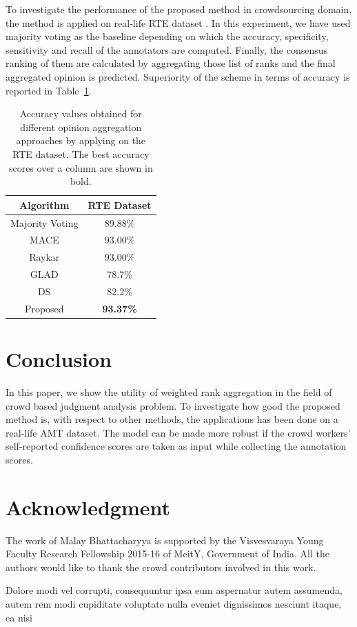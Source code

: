 \documentclass[letterpaper]{article}
\begin{document}
To investigate the performance of the proposed method in crowdsourcing domain, the method is applied on real-life RTE dataset \cite{Sheshadri2013}. In this experiment, we have used majority voting as the baseline depending on which the accuracy, specificity, sensitivity and recall of the annotators are computed. Finally, the consensus ranking of them are calculated by aggregating those list of ranks and the final aggregated opinion is predicted. Superiority of the scheme in terms of accuracy is reported in Table~\ref{table:crowd_aggregation}.

\begin{table}[!t]
\small
\renewcommand{\arraystretch}{1.0}%
\centering
\caption{Accuracy values obtained for different opinion aggregation approaches by applying on the RTE dataset. The best accuracy scores over a column  are shown in bold.}
\begin{tabular}{|c|c|}
\hline
{\bf Algorithm}  & {\bf RTE Dataset} \\\hline
Majority Voting  & 89.88\%       \\\hline
MACE  \cite{Hovy2013}	& 93.00\%   \\\hline
Raykar \cite{Rayker2011} & 93.00\%    \\\hline
GLAD \cite{Whitehill2009} & 78.7\%  \\\hline
DS \cite{Dawid1979} & 82.2\%     \\\hline
Proposed  & {\bf 93.37\%}     \\\hline
\end{tabular}%
\label{table:crowd_aggregation}
\end{table}




\section{Conclusion}
In this paper, we show the utility of weighted rank aggregation in the field of crowd based judgment analysis problem. To investigate how good the proposed method is, with respect to other methods, the applications has been done on a real-life AMT dataset. The model can be made more robust if the crowd workers' self-reported confidence scores are taken as input while collecting the annotation scores.




\section{Acknowledgment}
The work of Malay Bhattacharyya is supported by the Visvesvaraya Young Faculty Research Fellowship 2015-16 of MeitY, Government of India. All the authors would like to thank the crowd contributors involved in this work.





Dolore modi vel corrupti, consequuntur ipsa eum aspernatur autem assumenda, autem rem modi cupiditate voluptate nulla eveniet dignissimos nesciunt itaque, ea nisi

\end{document}

